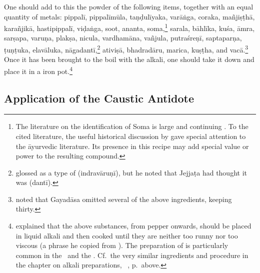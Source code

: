 \begin{translation}
One should add to this the powder of the following items, together
with an equal quantity of metals: \gls{pippalī}, \gls{pippalīmūla},
\gls{taṇḍulīyaka}, \gls{varāṅga}, \gls{coraka}, \gls{mañjiṣṭhā},
\gls{karañjikā}, \gls{hastipippalī}, \gls{viḍaṅga},
soot, \gls{ananta}, soma,\footnote{The
    literature on the identification of Soma is large and continuing
    \parencites[76--78, 125--131]{wuja-2003}{clar-2017}. To the cited
    literature, the useful historical discussion by
    \citet[449--455]{gvdb} gave special attention to the āyurvedic
    literature.  Its presence in this recipe may add special value or
    power to the resulting compound.} \gls{sarala}, \gls{bāhlīka},
    \gls{kuśa}, \gls{āmra}, \gls{sarṣapa}, \gls{varuṇa}, \gls{plakṣa},
    \gls{nicula}, \gls{vardhamāna}, \gls{vañjula}, \gls{putraśreṇī},
    \gls{saptaparṇa}, \gls{ṭuṇṭuka}, \gls{elavāluka},
    \gls{nāgadantī},\footnote{ glossed
         as a type of  (\gls{indravāruṇī}),
        but he noted that Jejjaṭa had thought it was 
        (\gls{dantī}).} \gls{ativiṣā}, \gls{bhadradāru}, \gls{marica},
        \gls{kuṣṭha}, and \gls{vacā}.\footnote{ noted
            that Gayadāsa omitted several of the above ingredients, keeping
            thirty.}  Once it has been brought to the boil with the alkali, one
            should take it down and place it in a iron
            pot.\footnote{\label{kṣārapāka2} explained 
            that
                the above substances, from pepper onwards, should be placed in 
                liquid
                alkali and then cooked until they are neither too runny nor too
                viscous (a phrase he copied from ).  The 
                preparation
                of  is particularly common in the \SS\ and the \AH.  Cf.\
                the very similar ingredients and procedure in the chapter on alkali
                preparations, \SS\ \Su{1.11.11}{46--47}, p.\,\pageref{kṣārapāka}
                above.}
               
\subsection{Application of the Caustic Antidote}               
                
\item[4]    


\end{translation}
